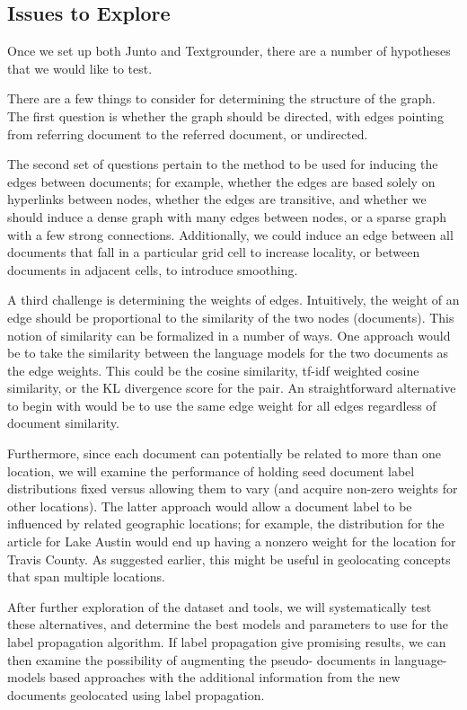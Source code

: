 \subsection{Issues to Explore}  

Once we set up both Junto and Textgrounder, there are a number of hypotheses
that we would like to test.

\par There are a few things to consider for determining the structure of the
graph. The first question is whether the graph should be directed, with edges
pointing from referring document to the referred document, or undirected.

\par The second set of questions pertain to the method to be used for inducing
the edges between documents; for example, whether the edges are based solely
on hyperlinks between nodes, whether the edges are transitive, and whether we
should induce a dense graph with many edges between nodes, or a sparse graph
with a few strong connections. Additionally, we could induce an edge between
all documents that fall in a particular grid cell to increase locality, or
between documents in adjacent cells, to introduce smoothing.

\par A third challenge is determining the weights of edges. Intuitively, the
weight of an edge should be proportional to the similarity of the two nodes
(documents). This notion of similarity can be formalized in a number of ways.
One approach would be to take the similarity between the language models for
the two documents as the edge weights. This could be the cosine similarity,
tf-idf weighted cosine similarity, or the KL divergence score for the pair. An
straightforward alternative to begin with would be to use the same edge weight
for all edges regardless of document similarity.
 
\par Furthermore, since each document can potentially be related to more than
one location, we will examine the performance of holding seed document label
distributions fixed versus allowing them to vary (and acquire non-zero weights
for other locations). The latter approach would allow a document label to be
influenced by related geographic locations;  for example, the distribution for
the article for Lake Austin would end up having a nonzero weight for the
location for Travis County. As suggested earlier, this might be useful in
geolocating concepts that span multiple locations.

\par After further exploration of the dataset and tools, we will
systematically test these alternatives, and determine the best models and
parameters to use for the label propagation algorithm. If label propagation
give promising results, we can then examine the possibility of augmenting the
pseudo- documents in language-models based approaches with the additional
information from the new documents geolocated using label propagation.

